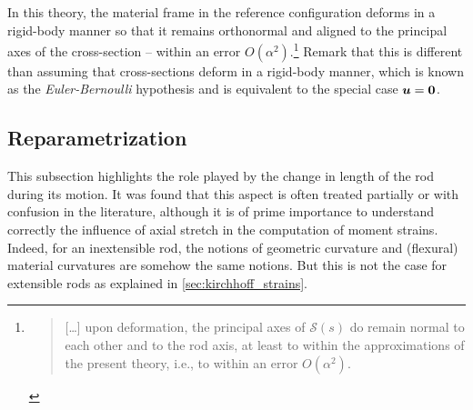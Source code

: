 In this theory, the material frame in the reference configuration deforms in a rigid-body manner so that it remains orthonormal and aligned to the principal axes of the cross-section -- within an error $O(\alpha^2)$.\footnote{\blockcquote[p.~344]{Coleman1993}{[\dots] upon deformation, the principal axes of $\mathcal{S}(s)$ do remain normal to each other and to the rod axis, at least to within the approximations of the present theory, i.e., to within an error $O(\alpha^2).$}.} Remark that this is different than assuming that cross-sections deform in a rigid-body manner, which is known as the \emph{Euler-Bernoulli} hypothesis and is equivalent to the special case $\boldsymbol{u} = \boldsymbol{0}$.

\subsection{Reparametrization}
This subsection highlights the role played by the change in length of the rod during its motion. It was found that this aspect is often treated partially or with confusion in the literature, although it is of prime importance to understand correctly the influence of axial stretch in the computation of moment strains. Indeed, for an inextensible rod, the notions of geometric curvature and (flexural) material curvatures are somehow the same notions. But this is not the case for extensible rods as explained in \cref{sec:kirchhoff_strains}.



